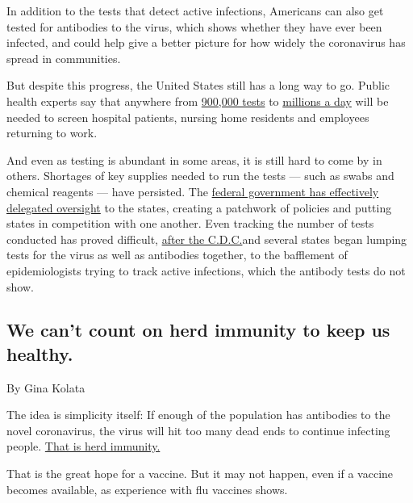 In addition to the tests that detect active infections, Americans can
also get tested for antibodies to the virus, which shows whether they
have ever been infected, and could help give a better picture for how
widely the coronavirus has spread in communities.

But despite this progress, the United States still has a long way to go.
Public health experts say that anywhere from
\href{https://www.npr.org/sections/health-shots/2020/05/07/851610771/u-s-coronavirus-testing-still-falls-short-hows-your-state-doing}{900,000
tests} to
\href{https://www.newyorker.com/news/q-and-a/paul-romer-on-how-to-survive-the-chaos-of-the-coronavirus}{millions
a day} will be needed to screen hospital patients, nursing home
residents and employees returning to work.

And even as testing is abundant in some areas, it is still hard to come
by in others. Shortages of key supplies needed to run the tests --- such
as swabs and chemical reagents --- have persisted. The
\href{https://www.nytimes3xbfgragh.onion/2020/05/25/health/coronavirus-testing-trump.html}{federal
government has effectively delegated oversight} to the states, creating
a patchwork of policies and putting states in competition with one
another. Even tracking the number of tests conducted has proved
difficult,
\href{https://www.nytimes3xbfgragh.onion/2020/05/22/us/politics/coronavirus-tests-cdc.html}{after
the C.D.C.}and several states began lumping tests for the virus as well
as antibodies together, to the bafflement of epidemiologists trying to
track active infections, which the antibody tests do not show.

\hypertarget{we-cant-count-on-herd-immunity-to-keep-us-healthy}{%
\subsection{We can't count on herd immunity to keep us
healthy.}\label{we-cant-count-on-herd-immunity-to-keep-us-healthy}}

By Gina Kolata

The idea is simplicity itself: If enough of the population has
antibodies to the novel coronavirus, the virus will hit too many dead
ends to continue infecting people.
\href{https://www.nytimes3xbfgragh.onion/interactive/2020/05/28/upshot/coronavirus-herd-immunity.html}{That
is herd immunity.}

That is the great hope for a vaccine. But it may not happen, even if a
vaccine becomes available, as experience with flu vaccines shows.

